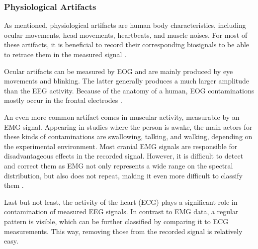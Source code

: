       \subsubsection{Physiological Artifacts}
        As mentioned, physiological artifacts are human body characteristics, including ocular movements, head movements, heartbeats, and muscle noises. For most of these artifacts, it is beneficial to record their corresponding biosignals to be able to retrace them in the measured signal \cite{Uriguen_2015}.\par
        Ocular artifacts can be measured by \ac{EOG} and are mainly produced by eye movements and blinking. The latter generally produces a much larger amplitude than the \ac{EEG} activity. Because of the anatomy of a human, \ac{EOG} contaminations mostly occur in the frontal electrodes \cite{Uriguen_2015}. \par
        An even more common artifact comes in muscular activity, measurable by an \ac{EMG} signal. Appearing in studies where the person is awake, the main actors for these kinds of contaminations are swallowing, talking, and walking, depending on the experimental environment. Most cranial \ac{EMG} signals are responsible for disadvantageous effects in the recorded signal. However, it is difficult to detect and correct them as \ac{EMG} not only represents a wide range on the spectral distribution, but also does not repeat, making it even more difficult to classify them \cite{Uriguen_2015}. \par
        Last but not least, the activity of the heart (\ac{ECG}) plays a significant role in contamination of measured \ac{EEG} signals. In contrast to \ac{EMG} data, a regular pattern is visible, which can be further classified by comparing it to \ac{ECG} measurements. This way, removing those from the recorded signal is relatively easy. \cite{Uriguen_2015}\par
